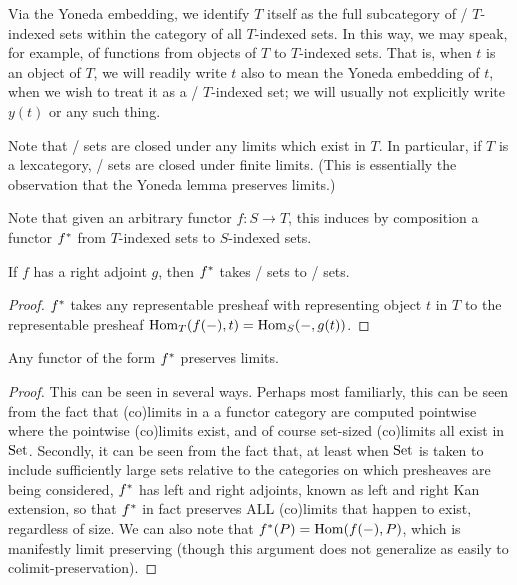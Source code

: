\begin{convention}
Via the Yoneda embedding, we identify $T$ itself as the full subcategory of \repsmall/ $T$-indexed sets within the category of all $T$-indexed sets. In this way, we may speak, for example, of functions from objects of $T$ to $T$-indexed sets. That is, when $t$ is an object of $T$, we will readily write $t$ also to mean the Yoneda embedding of $t$, when we wish to treat it as a \repsmall/ $T$-indexed set; we will usually not explicitly write $y(t)$ or any such thing.
\end{convention}

\begin{theorem}
Note that \repsmall/ sets are closed under any limits which exist in $T$. In particular, if $T$ is a lexcategory, \repsmall/ sets are closed under finite limits. (This is essentially the observation that the Yoneda lemma preserves limits.)
\end{theorem}

\begin{definition}
Note that given an arbitrary functor $f : S \to T$, this induces by composition a functor $f^*$ from $T$-indexed sets to $S$-indexed sets.
\end{definition}

\begin{theorem}\label{RepsmallRightAdjoint}
If $f$ has a right adjoint $g$, then $f^*$ takes \repsmall/ sets to \repsmall/ sets.
\end{theorem}
\begin{proof}
$f^*$ takes any representable presheaf with representing object $t$ in $T$ to the representable presheaf $\operatorname{Hom}_T(f(-), t) = \operatorname{Hom}_S(-, g(t))$.
\end{proof}

\begin{theorem}
Any functor of the form $f^*$ preserves limits.
\end{theorem}
\begin{proof}
This can be seen in several ways. Perhaps most familiarly, this can be seen from the fact that (co)limits in a a functor category are computed pointwise where the pointwise (co)limits exist, and of course set-sized (co)limits all exist in $\mathrm{Set}$. Secondly, it can be seen from the fact that, at least when $\mathrm{Set}$ is taken to include sufficiently large sets relative to the categories on which presheaves are being considered, $f^*$ has left and right adjoints, known as left and right Kan extension, so that $f^*$ in fact preserves ALL (co)limits that happen to exist, regardless of size. We can also note that $f^*(P) = \operatorname{Hom}(f(-), P)$, which is manifestly limit preserving (though this argument does not generalize as easily to colimit-preservation).
\end{proof}

